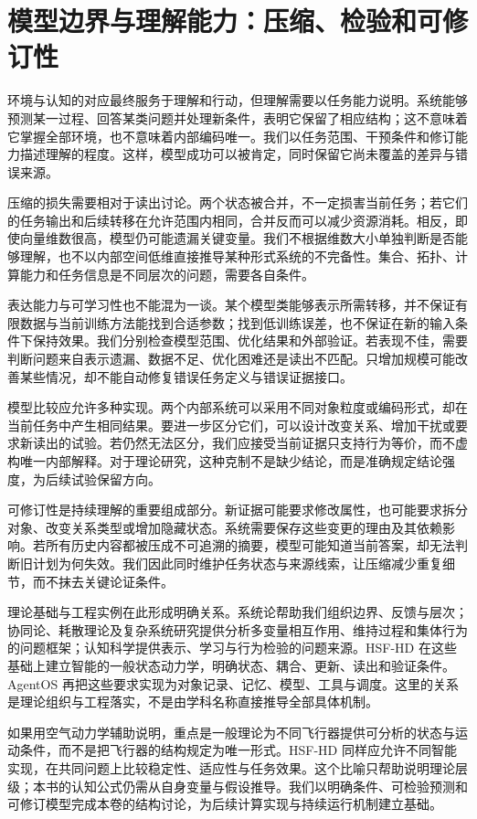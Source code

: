 \section{模型边界与理解能力：压缩、检验和可修订性}
\label{sec:godel_gap}

环境与认知的对应最终服务于理解和行动，但理解需要以任务能力说明。系统能够预测某一过程、回答某类问题并处理新条件，表明它保留了相应结构；这不意味着它掌握全部环境，也不意味着内部编码唯一。我们以任务范围、干预条件和修订能力描述理解的程度。这样，模型成功可以被肯定，同时保留它尚未覆盖的差异与错误来源。

压缩的损失需要相对于读出讨论。两个状态被合并，不一定损害当前任务；若它们的任务输出和后续转移在允许范围内相同，合并反而可以减少资源消耗。相反，即使向量维数很高，模型仍可能遗漏关键变量。我们不根据维数大小单独判断是否能够理解，也不以内部空间低维直接推导某种形式系统的不完备性。集合、拓扑、计算能力和任务信息是不同层次的问题，需要各自条件。

表达能力与可学习性也不能混为一谈。某个模型类能够表示所需转移，并不保证有限数据与当前训练方法能找到合适参数；找到低训练误差，也不保证在新的输入条件下保持效果。我们分别检查模型范围、优化结果和外部验证。若表现不佳，需要判断问题来自表示遗漏、数据不足、优化困难还是读出不匹配。只增加规模可能改善某些情况，却不能自动修复错误任务定义与错误证据接口。

模型比较应允许多种实现。两个内部系统可以采用不同对象粒度或编码形式，却在当前任务中产生相同结果。要进一步区分它们，可以设计改变关系、增加干扰或要求新读出的试验。若仍然无法区分，我们应接受当前证据只支持行为等价，而不虚构唯一内部解释。对于理论研究，这种克制不是缺少结论，而是准确规定结论强度，为后续试验保留方向。

可修订性是持续理解的重要组成部分。新证据可能要求修改属性，也可能要求拆分对象、改变关系类型或增加隐藏状态。系统需要保存这些变更的理由及其依赖影响。若所有历史内容都被压成不可追溯的摘要，模型可能知道当前答案，却无法判断旧计划为何失效。我们因此同时维护任务状态与来源线索，让压缩减少重复细节，而不抹去关键论证条件。

理论基础与工程实例在此形成明确关系。系统论帮助我们组织边界、反馈与层次；协同论、耗散理论及复杂系统研究提供分析多变量相互作用、维持过程和集体行为的问题框架；认知科学提供表示、学习与行为检验的问题来源。HSF-HD 在这些基础上建立智能的一般状态动力学，明确状态、耦合、更新、读出和验证条件。AgentOS 再把这些要求实现为对象记录、记忆、模型、工具与调度。这里的关系是理论组织与工程落实，不是由学科名称直接推导全部具体机制。

如果用空气动力学辅助说明，重点是一般理论为不同飞行器提供可分析的状态与运动条件，而不是把飞行器的结构规定为唯一形式。HSF-HD 同样应允许不同智能实现，在共同问题上比较稳定性、适应性与任务效果。这个比喻只帮助说明理论层级；本书的认知公式仍需从自身变量与假设推导。我们以明确条件、可检验预测和可修订模型完成本卷的结构讨论，为后续计算实现与持续运行机制建立基础。
